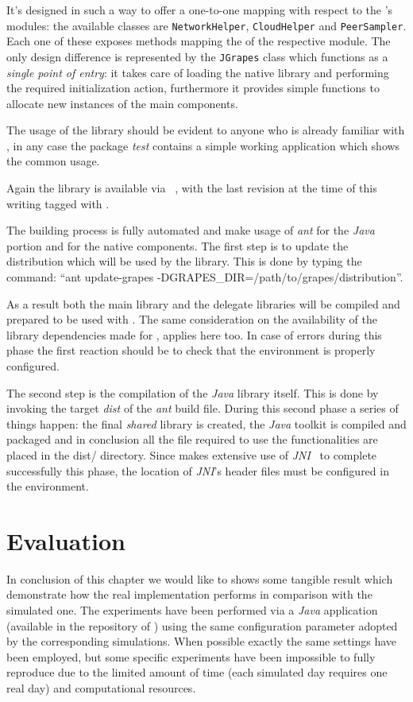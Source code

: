 It's designed in such a way to offer a one-to-one mapping with respect
to the \grapes's modules: the available classes are
\texttt{NetworkHelper}, \texttt{CloudHelper} and
\texttt{PeerSampler}. Each one of these exposes methods mapping the
\api of the respective \grapes module. The only design difference is
represented by the \texttt{JGrapes} class which functions as a
\textit{single point of entry}: it takes care of loading the native
library and performing the required initialization action, furthermore it
provides simple functions to allocate new instances of the main
components.

The usage of the library should be evident to anyone who is already
familiar with \grapes, in any case the package \emph{test} contains
a simple working application which shows the common usage.

Again the library is available via \github~\cite{jGRAPES-repo}, with
the last revision at the time of this writing tagged with
\thesistag.

The building process is fully automated and make usage of \emph{ant}
for the \emph{Java} portion and \make for the native components. The
first step is to update the \grapes distribution which will be used by
the library.
This is done by typing the command: ``ant update-grapes
-DGRAPES\_DIR=/path/to/grapes/distribution''.

As a result both the
main \grapes library and the \cloudhelper delegate libraries will be
compiled and prepared to be used with \jgrapes. The same consideration
on the availability of the library dependencies made for
\grapes, applies here too. In case of errors during this phase the
first reaction should be to check that the environment is properly
configured.

The second step is the compilation of the \emph{Java} library
itself. This is done by invoking the target \textit{dist} of the
\emph{ant} build file. During this second phase a series of things
happen: the final \emph{shared} library is created, the \textit{Java}
toolkit is compiled and packaged and in conclusion all the file
required to use the functionalities are placed in the \textsf{dist/}
directory.
Since \jgrapes makes extensive use of \emph{JNI}~\cite{JNIGuide} to
complete successfully this phase, the location of \emph{JNI}'s header
files must be configured in the environment.

\section{Evaluation}
In conclusion of this chapter we would like to shows some tangible
result which demonstrate how the real implementation performs in
comparison with the simulated one.
The experiments have been performed via a \emph{Java} application
(available in the repository of \jgrapes) using the same configuration
parameter adopted by the corresponding simulations. When possible
exactly the same settings have been employed,
but some specific experiments have been impossible to fully reproduce due to
the limited amount of time (each simulated day requires one real day)
and computational resources.

